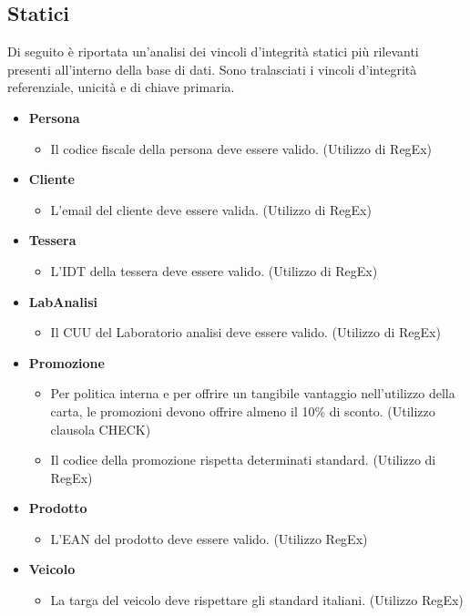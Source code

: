 \documentclass[12pt]{report}
\begin{document}
\subsection{Statici}
Di seguito è riportata un'analisi dei vincoli d'integrità statici più rilevanti presenti all'interno della base di dati. Sono tralasciati i vincoli d'integrità referenziale, unicità e di chiave primaria.
\begin{itemize}
\item \textbf{Persona}
	\begin{itemize}
	\item Il codice fiscale della persona deve essere valido. (Utilizzo di RegEx)
	\end{itemize}
\item \textbf{Cliente}
	\begin{itemize}
	\item L'email del cliente deve essere valida. (Utilizzo di RegEx)
	\end{itemize}
\item \textbf{Tessera}
	\begin{itemize}
	\item L'IDT della tessera deve essere valido. (Utilizzo di RegEx)
	\end{itemize}
\item \textbf{LabAnalisi}
	\begin{itemize}
	\item Il CUU del Laboratorio analisi deve essere valido. (Utilizzo di RegEx)
	\end{itemize}
\item \textbf{Promozione}
	\begin{itemize}
	\item Per politica interna e per offrire un tangibile vantaggio nell'utilizzo della carta, le promozioni devono offrire almeno il 10\% di sconto. (Utilizzo clausola CHECK)
	\item Il codice della promozione rispetta determinati standard. (Utilizzo di RegEx)
	\end{itemize}
\item \textbf{Prodotto}
	\begin{itemize}
	\item L'EAN del prodotto deve essere valido. (Utilizzo RegEx)
	\end{itemize}
\item \textbf{Veicolo}
	\begin{itemize}
	\item La targa del veicolo deve rispettare gli standard italiani. (Utilizzo RegEx)

\end{itemize}
\end{itemize}
\end{document}
